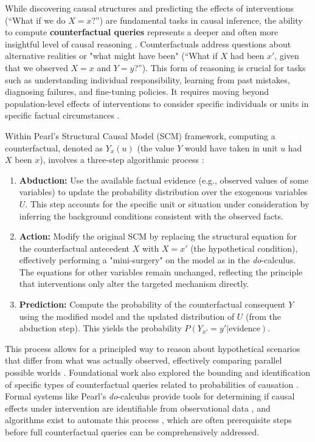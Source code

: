 While discovering causal structures and predicting the effects of interventions (``What if we do $X=x$?'') are fundamental tasks in causal inference, the ability to compute \textbf{counterfactual queries} represents a deeper and often more insightful level of causal reasoning \cite{Pearl2009Causality}. Counterfactuals address questions about alternative realities or "what might have been" (``What if $X$ had been $x'$, given that we observed $X=x$ and $Y=y$?''). This form of reasoning is crucial for tasks such as understanding individual responsibility, learning from past mistakes, diagnosing failures, and fine-tuning policies. It requires moving beyond population-level effects of interventions to consider specific individuals or units in specific factual circumstances \cite{Pearl2009Causality, Balke1994Probabilistic}.

Within Pearl's Structural Causal Model (SCM) framework, computing a counterfactual, denoted as $Y_x(u)$ (the value $Y$ would have taken in unit $u$ had $X$ been $x$), involves a three-step algorithmic process \cite{Pearl2009Causality}:
\begin{enumerate}
    \item \textbf{Abduction:} Use the available factual evidence (e.g., observed values of some variables) to update the probability distribution over the exogenous variables $U$. This step accounts for the specific unit or situation under consideration by inferring the background conditions consistent with the observed facts.
    \item \textbf{Action:} Modify the original SCM by replacing the structural equation for the counterfactual antecedent $X$ with $X=x'$ (the hypothetical condition), effectively performing a "mini-surgery" on the model as in the \textit{do}-calculus. The equations for other variables remain unchanged, reflecting the principle that interventions only alter the targeted mechanism directly.
    \item \textbf{Prediction:} Compute the probability of the counterfactual consequent $Y$ using the modified model and the updated distribution of $U$ (from the abduction step). This yields the probability $P(Y_{x'} = y' | \text{evidence})$.
\end{enumerate}

This process allows for a principled way to reason about hypothetical scenarios that differ from what was actually observed, effectively comparing parallel possible worlds \cite{Pearl2009Causality, Morgan2015Counterfactuals}. Foundational work also explored the bounding and identification of specific types of counterfactual queries related to probabilities of causation \cite{tian2000probabilities}. Formal systems like Pearl's \textit{do}-calculus provide tools for determining if causal effects under intervention are identifiable from observational data \cite{tian2002identification}, and algorithms exist to automate this process \cite{shpitser2012efficient}, which are often prerequisite steps before full counterfactual queries can be comprehensively addressed.

